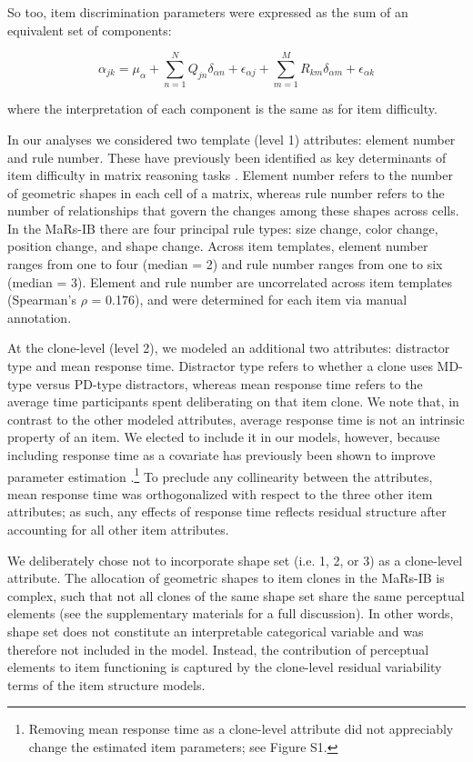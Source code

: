 \documentclass[a4paper,man,natbib]{apa6}
\begin{document}
\noindent So too, item discrimination parameters were expressed as the sum of an equivalent set of components:

\begin{equation}
\alpha_{jk} = \mu_\alpha + \sum_{n=1}^N Q_{jn} \delta_{\alpha n} + \epsilon_{\alpha j} + \sum_{m=1}^M R_{km} \delta_{\alpha m} + \epsilon_{\alpha k}
\end{equation}

\noindent where the interpretation of each component is the same as for item difficulty.

In our analyses we considered two template (level 1) attributes: element number and rule number. These have previously been identified as key determinants of item difficulty in matrix reasoning tasks \citep{embretson1998cognitive, primi2001complexity}. Element number refers to the number of geometric shapes in each cell of a matrix, whereas rule number refers to the number of relationships that govern the changes among these shapes across cells. In the MaRs-IB there are four principal rule types: size change, color change, position change, and shape change. Across item templates, element number ranges from one to four (median = 2) and rule number ranges from one to six (median = 3). Element and rule number are uncorrelated across item templates (Spearman's $\rho$ = 0.176), and were determined for each item via manual annotation.  

At the clone-level (level 2), we modeled an additional two attributes: distractor type and mean response time. Distractor type refers to whether a clone uses MD-type versus PD-type distractors, whereas mean response time refers to the average time participants spent deliberating on that item clone. We note that, in contrast to the other modeled attributes, average response time is not an intrinsic property of an item. We elected to include it in our models, however, because including response time as a covariate has previously been shown to improve parameter estimation \citep{bertling2018using}.\footnote{Removing mean response time as a clone-level attribute did not appreciably change the estimated item parameters; see Figure S1.} To preclude any collinearity between the attributes, mean response time was orthogonalized with respect to the three other item attributes; as such, any effects of response time reflects residual structure after accounting for all other item attributes.

We deliberately chose not to incorporate shape set (i.e. 1, 2, or 3) as a clone-level attribute. The allocation of geometric shapes to item clones in the MaRs-IB is complex, such that not all clones of the same shape set share the same perceptual elements (see the supplementary materials for a full discussion). In other words, shape set does not constitute an interpretable categorical variable and was therefore not included in the model. Instead, the contribution of perceptual elements to item functioning is captured by the clone-level residual variability terms of the item structure models.
\end{document}
